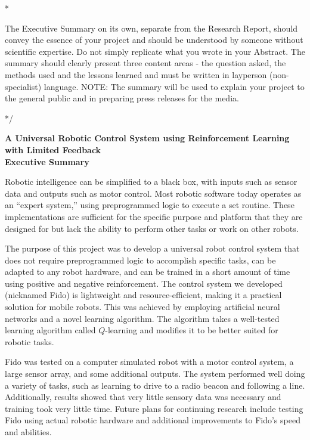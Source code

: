\documentclass[letterpaper,12pt]{article}
\begin{document}
\/*

The Executive Summary on its own, separate from the Research Report, should convey the essence of your project and should be understood by someone without scientific expertise. Do not simply replicate what you wrote in your Abstract. The summary should clearly present three content areas - the question asked, the methods used and the lessons learned and must be written in layperson (non-specialist) language. NOTE: The summary will be used to explain your project to the general public and in preparing press releases for the media.

*/

\begin{center}
	{\Large
	\textbf{A Universal Robotic Control System using Reinforcement Learning with Limited Feedback}}\\
	\vspace{1cm}
	{\large \textbf{Executive Summary}}
\end{center}

\noindent

Robotic intelligence can be simplified to a black box, with inputs such as sensor data and outputs such as motor control.  Most robotic software today operates as an ``expert system,'' using preprogrammed logic to execute a set routine.  These implementations are sufficient for the specific purpose and platform that they are designed for but lack the ability to perform other tasks or work on other robots.

The purpose of this project was to develop a universal robot control system that does not require preprogrammed logic to accomplish specific tasks, can be adapted to any robot hardware, and can be trained in a short amount of time using positive and negative reinforcement.  The control system we developed (nicknamed Fido) is lightweight and resource-efficient, making it a practical solution for mobile robots.  This was achieved by employing artificial neural networks and a novel learning algorithm.  The algorithm takes a well-tested learning algorithm called $Q$-learning and modifies it to be better suited for robotic tasks.

Fido was tested on a computer simulated robot with a motor control system, a large sensor array, and some additional outputs.  The system performed well doing a variety of tasks, such as learning to drive to a radio beacon and following a line.  Additionally, results showed that very little sensory data was necessary and training took very little time.  Future plans for continuing research include testing Fido using actual robotic hardware and additional improvements to Fido's speed and abilities.
\end{document}
